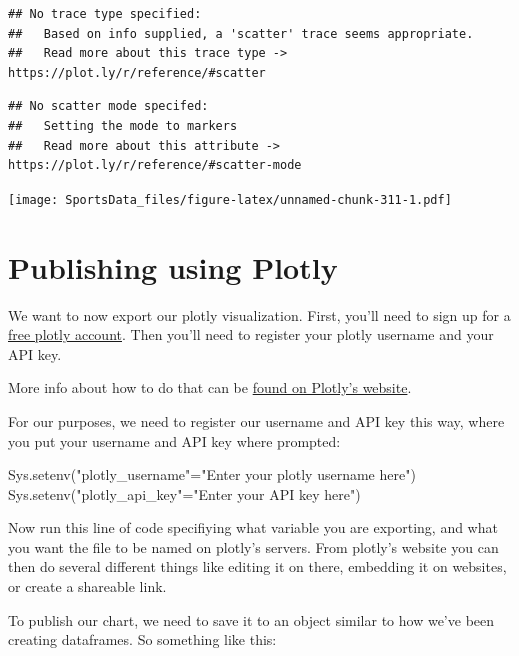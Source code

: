 \documentclass[
]{book}
\newenvironment{Shaded}{\begin{snugshade}}{\end{snugshade}}
\newcommand{\FunctionTok}[1]{\textcolor[rgb]{0.00,0.00,0.00}{#1}}
\newcommand{\NormalTok}[1]{#1}
\newcommand{\OtherTok}[1]{\textcolor[rgb]{0.56,0.35,0.01}{#1}}
\newcommand{\StringTok}[1]{\textcolor[rgb]{0.31,0.60,0.02}{#1}}
\begin{document}
\begin{verbatim}
## No trace type specified:
##   Based on info supplied, a 'scatter' trace seems appropriate.
##   Read more about this trace type -> https://plot.ly/r/reference/#scatter
\end{verbatim}

\begin{verbatim}
## No scatter mode specifed:
##   Setting the mode to markers
##   Read more about this attribute -> https://plot.ly/r/reference/#scatter-mode
\end{verbatim}

\texttt{[image: SportsData\_files/figure-latex/unnamed-chunk-311-1.pdf]}

\hypertarget{publishing-using-plotly}{%
\section{Publishing using Plotly}\label{publishing-using-plotly}}

We want to now export our plotly visualization. First, you'll need to sign up for a \href{https://chart-studio.plotly.com/Auth/login/\#/}{free plotly account}. Then you'll need to register your plotly username and your API key.

More info about how to do that can be \href{https://plot.ly/r/getting-started/\#initialization-for-online-plotting}{found on Plotly's website}.

For our purposes, we need to register our username and API key this way, where you put your username and API key where prompted:

\begin{Shaded}
\begin{Highlighting}[]
\FunctionTok{Sys.setenv}\NormalTok{(}\StringTok{"plotly\_username"}\OtherTok{=}\StringTok{"Enter your plotly username here"}\NormalTok{)}
\FunctionTok{Sys.setenv}\NormalTok{(}\StringTok{"plotly\_api\_key"}\OtherTok{=}\StringTok{"Enter your API key here"}\NormalTok{)}
\end{Highlighting}
\end{Shaded}

Now run this line of code specifiying what variable you are exporting, and what you want the file to be named on plotly's servers. From plotly's website you can then do several different things like editing it on there, embedding it on websites, or create a shareable link.

To publish our chart, we need to save it to an object similar to how we've been creating dataframes. So something like this:
\end{document}
